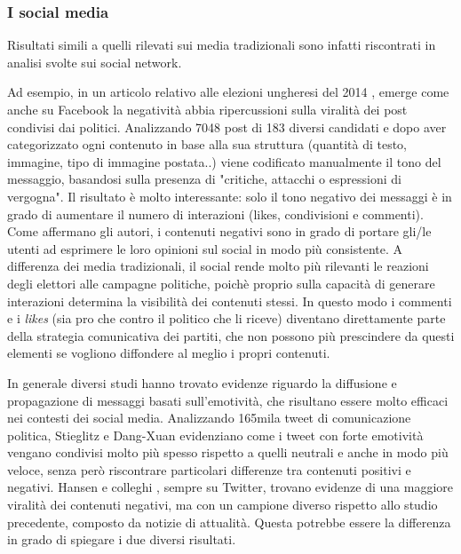 \subsubsection{I social media}
Risultati simili a quelli rilevati sui media tradizionali sono infatti riscontrati in  analisi svolte sui social network.

Ad esempio, in un articolo relativo alle elezioni ungheresi del 2014 \citep{bene2017}, emerge come anche su Facebook la negatività abbia ripercussioni sulla viralità dei post condivisi dai politici. Analizzando 7048 post di 183 diversi candidati e dopo aver categorizzato ogni contenuto in base alla sua struttura (quantità di testo, immagine, tipo di immagine postata..) viene codificato manualmente il tono del messaggio, basandosi sulla presenza di "critiche, attacchi o espressioni di vergogna". Il risultato è molto interessante: solo il tono negativo dei messaggi è in grado di aumentare il numero di interazioni (likes, condivisioni e commenti). Come affermano gli autori, i contenuti negativi sono in grado di portare gli/le utenti ad esprimere le loro opinioni sul social in modo più consistente. A differenza dei media tradizionali, il social rende molto più rilevanti le reazioni degli elettori alle campagne politiche, poichè proprio sulla capacità di generare interazioni determina la visibilità dei contenuti stessi. In questo modo i commenti e i \textit{likes} (sia pro che contro il politico che li riceve) diventano direttamente parte della strategia comunicativa dei partiti, che non possono più prescindere da questi elementi se vogliono diffondere al meglio i propri contenuti.

In generale diversi studi \citep{berger2010} \citep{stieglitz2013} hanno trovato evidenze riguardo la diffusione e propagazione di messaggi basati sull'emotività, che risultano essere molto efficaci nei contesti dei social media. Analizzando 165mila tweet di comunicazione politica, Stieglitz e Dang-Xuan evidenziano come i tweet con forte emotività vengano condivisi molto più spesso rispetto a quelli neutrali e anche in modo più veloce, senza però riscontrare particolari differenze tra contenuti positivi e negativi. Hansen e colleghi \citep{hansen2011}, sempre su Twitter, trovano evidenze di una maggiore viralità dei contenuti negativi, ma con un campione diverso rispetto allo studio precedente, composto da notizie di attualità. Questa potrebbe essere la differenza in grado di spiegare i due diversi risultati.

